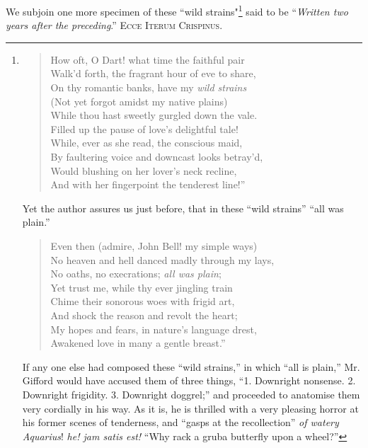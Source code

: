 We subjoin one more specimen of these ``wild strains"\footnote{
\begin{verse}
  How oft, O Dart! what time the faithful pair \\
  Walk'd forth, the fragrant hour of eve to share, \\
  On thy romantic banks, have my \emph{wild strains} \\
  (Not yet forgot amidst my native plains)\\
  While thou hast sweetly gurgled down the vale.  \\
  Filled up the pause of love's delightful tale!  \\
  While, ever as she read, the conscious maid, \\
  By faultering voice and downcast looks betray'd, \\
  Would blushing on her lover's neck recline, \\
  And with her finger\textemdash point the tenderest line!''
\end{verse}

Yet the author assures us just before, that in these ``wild strains'' ``all
was plain.''
\begin{verse}
  Even then (admire, John Bell! my simple ways) \\
  No heaven and hell danced madly through my lays, \\
  No oaths, no execrations; \emph{all was plain}; \\
  Yet trust me, while thy ever jingling train \\
  Chime their sonorous woes with frigid art, \\
  And shock the reason and revolt the heart; \\
  My hopes and fears, in nature's language drest, \\
  Awakened love in many a gentle breast.''
\end{verse}

If any one else had composed these ``wild strains,'' in which ``all is
plain,'' Mr. Gifford would have accused them of three things, ``1.
Downright nonsense. 2. Downright frigidity. 3. Downright doggrel;'' and
proceeded to anatomise them very cordially in his way. As it is, he is
thrilled with a very pleasing horror at his former scenes of tenderness,
and ``gasps at the recollection'' \emph{of watery Aquarius}!
\emph{he! jam satis est!} ``Why rack a grub\textemdash a butterfly upon a wheel?''} said to be
``\emph{Written two years after the preceding}.'' \textsc{Ecce Iterum Crispinus}.

